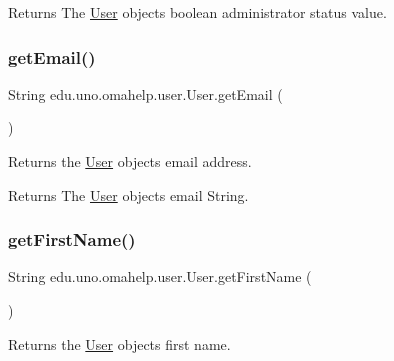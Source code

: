 \begin{DoxyReturn}{Returns}
The \mbox{\hyperlink{classedu_1_1uno_1_1omahelp_1_1user_1_1_user}{User}} object\textquotesingle{}s boolean administrator status value. 
\end{DoxyReturn}
\mbox{\label{classedu_1_1uno_1_1omahelp_1_1user_1_1_user_a917ce4b8235914cf18e424034c152825}} 
\subsubsection{\texorpdfstring{get\+Email()}{getEmail()}}
{\footnotesize\ttfamily String edu.\+uno.\+omahelp.\+user.\+User.\+get\+Email (\begin{DoxyParamCaption}{ }\end{DoxyParamCaption})}

Returns the \mbox{\hyperlink{classedu_1_1uno_1_1omahelp_1_1user_1_1_user}{User}} object\textquotesingle{}s email address.

\begin{DoxyReturn}{Returns}
The \mbox{\hyperlink{classedu_1_1uno_1_1omahelp_1_1user_1_1_user}{User}} object\textquotesingle{}s email String. 
\end{DoxyReturn}
\mbox{\label{classedu_1_1uno_1_1omahelp_1_1user_1_1_user_aa1b0e5a5e7716c13ccbc4f1a96178de2}} 
\subsubsection{\texorpdfstring{get\+First\+Name()}{getFirstName()}}
{\footnotesize\ttfamily String edu.\+uno.\+omahelp.\+user.\+User.\+get\+First\+Name (\begin{DoxyParamCaption}{ }\end{DoxyParamCaption})}

Returns the \mbox{\hyperlink{classedu_1_1uno_1_1omahelp_1_1user_1_1_user}{User}} object\textquotesingle{}s first name.

